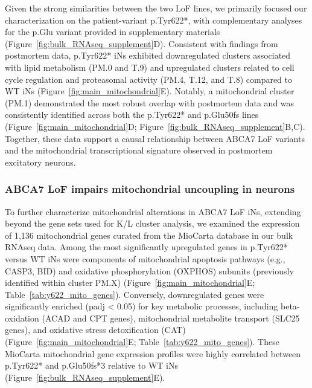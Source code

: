 Given the strong similarities between the two LoF lines, we primarily focused our characterization on the patient-variant p.Tyr622*, with complementary analyses for the p.Glu variant provided in supplementary materials (Figure~\ref{fig:bulk_RNAseq_supplement}D). Consistent with findings from postmortem data, p.Tyr622* iNs exhibited downregulated clusters associated with lipid metabolism (PM.0 and T.9) and upregulated clusters related to cell cycle regulation and proteasomal activity (PM.4, T.12, and T.8) compared to WT iNs (Figure~\ref{fig:main_mitochondrial}E). Notably, a mitochondrial cluster (PM.1) demonstrated the most robust overlap with postmortem data and was consistently identified across both the p.Tyr622* and p.Glu50fs lines (Figure~\ref{fig:main_mitochondrial}D; Figure~\ref{fig:bulk_RNAseq_supplement}B,C). Together, these data support a causal relationship between ABCA7 LoF variants and the mitochondrial transcriptional signature observed in postmortem excitatory neurons.

\subsubsection{ABCA7 LoF impairs mitochondrial uncoupling in neurons}
To further characterize mitochondrial alterations in ABCA7 LoF iNs, extending beyond the gene sets used for K/L cluster analysis, we examined the expression of 1,136 mitochondrial genes curated from the MioCarta database in our bulk RNAseq data. Among the most significantly upregulated genes in p.Tyr622* versus WT iNs were components of mitochondrial apoptosis pathways (e.g., CASP3, BID) and oxidative phosphorylation (OXPHOS) subunits (previously identified within cluster PM.X) (Figure~\ref{fig:main_mitochondrial}E; Table~\ref{tab:y622_mito_genes}). Conversely, downregulated genes were significantly enriched (padj < 0.05) for key metabolic processes, including beta-oxidation (ACAD and CPT genes), mitochondrial metabolite transport (SLC25 genes), and oxidative stress detoxification (CAT) (Figure~\ref{fig:main_mitochondrial}E; Table~\ref{tab:y622_mito_genes}). These MioCarta mitochondrial gene expression profiles were highly correlated between p.Tyr622* and p.Glu50fs*3 relative to WT iNs (Figure~\ref{fig:bulk_RNAseq_supplement}E).

